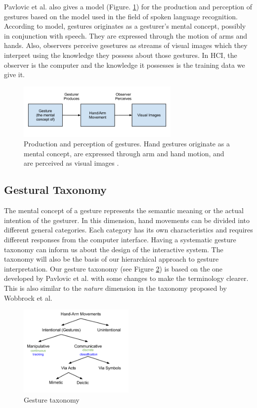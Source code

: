 Pavlovic et al. \cite{Pavlovic97} also gives a model (Figure. 
\ref{fig:gesture_production}) for the production and perception of gestures 
based on the model used in the field of spoken language recognition. According 
to model, gestures originates as a gesturer's mental concept, possibly in 
conjunction with speech. They are expressed through the motion of arms and 
hands. Also, observers perceive gesetures as streams of visual images which they
interpret using the knowledge they possess about those gestures. In HCI, the 
observer is the computer and the knowledge it possesses is the training data we 
give it.

\begin{figure}[h]
  \centering
  \includegraphics[width=0.7\textwidth]{figures/gesture_production.png} 
  \caption{Production and perception of gestures. Hand gestures originate as a
  mental concept, are expressed through arm and hand motion, and are perceived
  as visual images \cite{Pavlovic97}.}
  \label{fig:gesture_production}
\end{figure}

\subsection{Gestural Taxonomy}\label{sec:taxonomy}
The mental concept of a gesture represents the semantic meaning or the
actual intention of the gesturer. In this dimension, hand movements can be
divided into different general categories. Each category has its own characteristics and requires different responses from the computer interface. Having a systematic gesture taxonomy can inform
us about the design of the interactive system. The taxonomy will also be the
basis of our hierarchical approach to gesture interpretation. Our gesture
taxonomy (see Figure \ref{fig:taxonomy}) is based on the one developed by Pavlovic et al.
\cite{Pavlovic97} with some changes to make the terminology clearer. This is
also similar to the \textit{nature} dimension in the taxonomy proposed by
Wobbrock et al.
\cite{wobbrock09}

\begin{figure}[h]
  \centering
  \includegraphics[width=0.5\textwidth]{figures/taxonomy.png} 
  \caption{Gesture taxonomy}
  \label{fig:taxonomy}
\end{figure}

